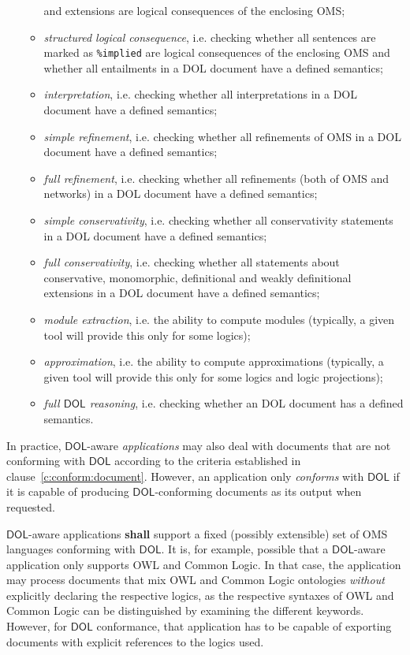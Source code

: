 \documentclass[10pt,fleqn,final]{scrreprt}
\newcommand{\cbs}[0]{\color{red}\xspace} %
\newcommand{\cbe}[0]{\color{black}\xspace} %
\newcommand*{\syntax}[1]{\texttt{#1}}
\newcommand*{\shall}{\textbf{shall}\xspace}
\newcommand*{\DOL}{\ensuremath{\mathsf{DOL}}\xspace}
\newcommand{\clauserefname}{clause}
\newcommand{\cref}[1]{\clauserefname~\ref{#1}}
\begin{document}
\begin{itemize}
\begin{itemize}
and extensions are logical consequences
of the enclosing OMS;
\item \emph{structured logical consequence}, i.e.\cbs checking whether all sentences are\cbe marked as \syntax{\%implied} are logical consequences
  of the enclosing OMS and whether all entailments in a DOL document
  have a defined semantics;
\item \emph{interpretation}, i.e.\cbs checking whether\cbe all interpretations in a DOL document have a defined semantics;
\item \emph{simple refinement}, i.e.\cbs checking whether\cbe all
  refinements of OMS in a DOL document have a defined semantics;
\item \emph{full refinement}, i.e.\cbs checking whether\cbe all refinements
  (both of OMS and networks) in a DOL document have a defined
  semantics;
\item \emph{simple conservativity}, i.e.\cbs checking whether\cbe all conservativity
  statements in a DOL document have a defined semantics;
\item \emph{full conservativity}, i.e.\cbs checking whether\cbe all
  statements about conservative, monomorphic, definitional and weakly
  definitional extensions in a DOL document have a defined semantics;
\item \emph{module extraction}, i.e. the ability to compute modules
(typically, a given tool will provide this only for some logics);
\item \emph{approximation}, i.e. the ability to compute approximations
(typically, a given tool will provide this only for some logics
and logic projections);
\item \emph{full \DOL reasoning}, i.e.\cbs checking whether\cbe an DOL
  document has a defined semantics.
\end{itemize}
\end{itemize}
\cbe

In practice, \DOL-aware \emph{applications} may also deal with documents that are not conforming 
with \DOL according to the criteria established in \cref{c:conform:document}.  However, an 
application only \emph{conforms} with \DOL if it is capable of producing \DOL-conforming documents as 
its output when requested.

\cbs
\DOL-aware applications \shall support a fixed (possibly extensible) set of OMS languages
conforming with \DOL.
\cbe
  It is, for example, possible that a \DOL-aware application only supports OWL
and Common Logic.  In that case, the application may process documents that mix OWL and Common 
Logic ontologies \emph{without} explicitly declaring the respective logics, as the respective 
syntaxes of OWL and Common Logic can be distinguished by examining the different keywords.  
However, for \DOL conformance, that application has to be capable of exporting documents with 
explicit references to the logics used.
\end{document}
